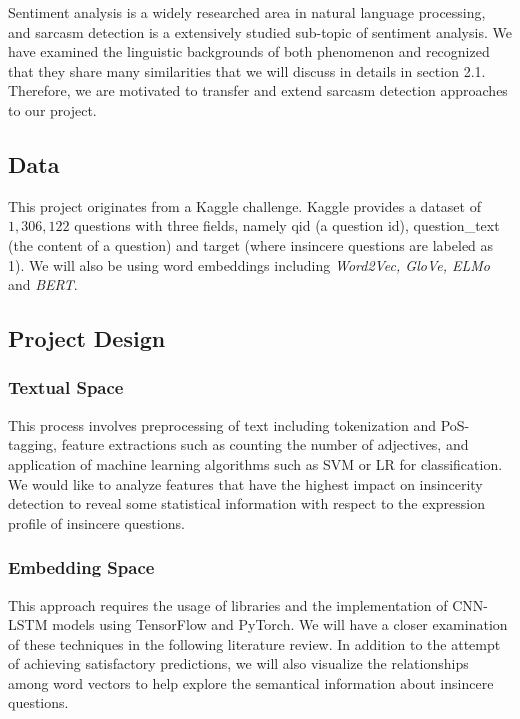 \documentclass[12pt]{diazessay} %
\begin{document}
Sentiment analysis is a widely researched area in natural language processing, and sarcasm detection is a extensively studied sub-topic of sentiment analysis. We have examined the linguistic backgrounds of both phenomenon and recognized that they share many similarities that we will discuss in details in section 2.1. Therefore, we are motivated to transfer and extend sarcasm detection approaches to our project. 

\subsection{Data}

This project originates from a Kaggle challenge. Kaggle provides a dataset of $1,306,122$ questions with three fields, namely qid (a question id), question\_text (the content of a question) and target (where insincere questions are labeled as 1). We will also be using word embeddings including \textit{Word2Vec, GloVe, ELMo} and \textit{BERT}. 

\subsection{Project Design}

\subsubsection{Textual Space}

This process involves preprocessing of text including tokenization and PoS-tagging, feature extractions such as counting the number of adjectives, and application of machine learning algorithms such as SVM or LR for classification. We would like to analyze features that have the highest impact on insincerity detection to reveal some statistical information with respect to the expression profile of insincere questions. 

\subsubsection{Embedding Space}

This approach requires the usage of libraries and the implementation of CNN-LSTM models using TensorFlow and PyTorch. We will have a closer examination of these techniques in the following literature review. In addition to the attempt of achieving satisfactory predictions, we will also visualize the relationships among word vectors to help explore the semantical information about insincere questions.
\end{document}
